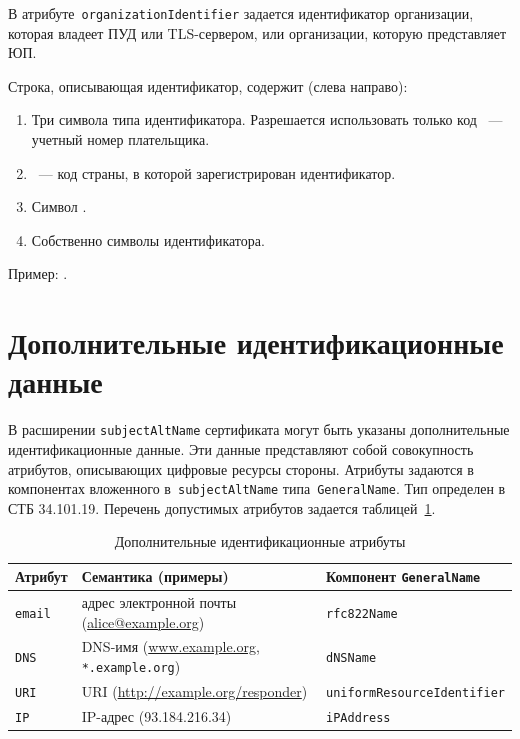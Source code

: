 В атрибуте~\texttt{organizationIdentifier} задается идентификатор организации,
которая владеет ПУД или TLS-сервером, или организации, которую 
представляет ЮП.

Строка, описывающая идентификатор, содержит (слева направо):
\begin{enumerate}
\item
Три символа типа идентификатора.
Разрешается использовать только код 
~--- учетный номер плательщика.

\item
{}~--- код страны, в которой зарегистрирован идентификатор.

\item
Символ \str{-}.
\item
Собственно символы идентификатора.
\end{enumerate}

Пример: .

\section{Дополнительные идентификационные данные}\label{ENTITIES.SAN}

В расширении \texttt{subjectAltName} сертификата могут быть указаны 
дополнительные идентификационные данные. Эти данные представляют собой 
совокупность атрибутов, описывающих цифровые ресурсы стороны. 
%
Атрибуты задаются в компонентах вложенного в~\texttt{subjectAltName} 
типа~\texttt{GeneralName}. Тип определен в СТБ 34.101.19.
%
Перечень допустимых атрибутов задается таблицей~\ref{Table.ENTITIES.AttrsEx}. 

\begin{table}[bht]
\caption{Дополнительные идентификационные атрибуты}
\label{Table.ENTITIES.AttrsEx}
\begin{tabular}{|l|p{8.9cm}|l|}
\hline
Атрибут & Семантика (примеры) & Компонент \texttt{GeneralName}\\
\hline
\hline
\texttt{email} & 
адрес электронной почты (\url{alice@example.org}) & 
\verb|rfc822Name|\\
%
\texttt{DNS} & 
DNS-имя (\url{www.example.org}, \texttt{*.example.org}) &
\verb|dNSName|\\
%
\texttt{URI} & 
URI (\url{http://example.org/responder}) &
\verb|uniformResourceIdentifier|\\
%
\texttt{IP} & 
IP-адрес (93.184.216.34) &
\verb|iPAddress|\\
\hline                                      
\end{tabular}
\end{table}

